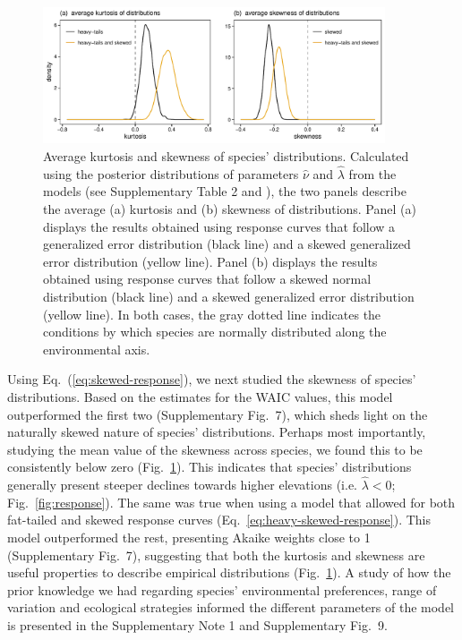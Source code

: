 \documentclass[11pt, a4paper]{article}
\begin{document}
\begin{figure}[ht]
  \centering
    \includegraphics[width=0.9\textwidth]{figures/kurto-skew}
    	  \vspace{0.1cm}
	   \caption{Average kurtosis and skewness of species' distributions. Calculated using the posterior distributions of parameters $\hat{\nu}$ and $\hat{\lambda}$ from the models (see Supplementary Table 2 and \citealt{vignette}), the two panels describe the average (a) kurtosis and (b) skewness of distributions. Panel (a) displays the results obtained using response curves that follow a generalized error distribution (black line) and a skewed generalized error distribution (yellow line). Panel (b) displays the results obtained using response curves that follow a skewed normal distribution (black line) and a skewed generalized error distribution (yellow line). In both cases, the gray dotted line indicates the conditions by which species are normally distributed along the environmental axis.}
      \label{fig:kurtosis-skewness}
\end{figure}

Using Eq.~(\ref{eq:skewed-response}), we next studied the skewness of species' distributions. Based on the estimates for the WAIC values, this model outperformed the first two (Supplementary Fig.~7), which sheds light on the naturally skewed nature of species' distributions. Perhaps most importantly, studying the mean value of the skewness across species, we found this to be consistently below zero (Fig.~\ref{fig:kurtosis-skewness}). This indicates that species' distributions generally present steeper declines towards higher elevations (i.e. $\hat{\lambda}<0$; Fig.~\ref{fig:response}). The same was true when using a model that allowed for both fat-tailed and skewed response curves (Eq.~\ref{eq:heavy-skewed-response}). This model outperformed the rest, presenting Akaike weights close to 1 (Supplementary Fig.~7), suggesting that both the kurtosis and skewness are useful properties to describe empirical distributions (Fig.~\ref{fig:kurtosis-skewness}). A study of how the prior knowledge we had regarding species' environmental preferences, range of variation and ecological strategies informed the different parameters of the model is presented in the Supplementary Note 1 and Supplementary Fig.~9. %
\end{document}
